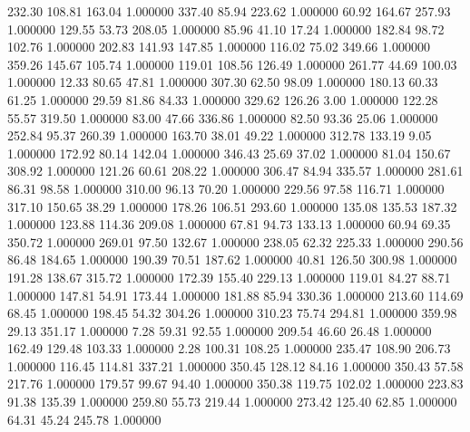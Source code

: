     232.30    108.81    163.04  1.000000
    337.40     85.94    223.62  1.000000
     60.92    164.67    257.93  1.000000
    129.55     53.73    208.05  1.000000
     85.96     41.10     17.24  1.000000
    182.84     98.72    102.76  1.000000
    202.83    141.93    147.85  1.000000
    116.02     75.02    349.66  1.000000
    359.26    145.67    105.74  1.000000
    119.01    108.56    126.49  1.000000
    261.77     44.69    100.03  1.000000
     12.33     80.65     47.81  1.000000
    307.30     62.50     98.09  1.000000
    180.13     60.33     61.25  1.000000
     29.59     81.86     84.33  1.000000
    329.62    126.26      3.00  1.000000
    122.28     55.57    319.50  1.000000
     83.00     47.66    336.86  1.000000
     82.50     93.36     25.06  1.000000
    252.84     95.37    260.39  1.000000
    163.70     38.01     49.22  1.000000
    312.78    133.19      9.05  1.000000
    172.92     80.14    142.04  1.000000
    346.43     25.69     37.02  1.000000
     81.04    150.67    308.92  1.000000
    121.26     60.61    208.22  1.000000
    306.47     84.94    335.57  1.000000
    281.61     86.31     98.58  1.000000
    310.00     96.13     70.20  1.000000
    229.56     97.58    116.71  1.000000
    317.10    150.65     38.29  1.000000
    178.26    106.51    293.60  1.000000
    135.08    135.53    187.32  1.000000
    123.88    114.36    209.08  1.000000
     67.81     94.73    133.13  1.000000
     60.94     69.35    350.72  1.000000
    269.01     97.50    132.67  1.000000
    238.05     62.32    225.33  1.000000
    290.56     86.48    184.65  1.000000
    190.39     70.51    187.62  1.000000
     40.81    126.50    300.98  1.000000
    191.28    138.67    315.72  1.000000
    172.39    155.40    229.13  1.000000
    119.01     84.27     88.71  1.000000
    147.81     54.91    173.44  1.000000
    181.88     85.94    330.36  1.000000
    213.60    114.69     68.45  1.000000
    198.45     54.32    304.26  1.000000
    310.23     75.74    294.81  1.000000
    359.98     29.13    351.17  1.000000
      7.28     59.31     92.55  1.000000
    209.54     46.60     26.48  1.000000
    162.49    129.48    103.33  1.000000
      2.28    100.31    108.25  1.000000
    235.47    108.90    206.73  1.000000
    116.45    114.81    337.21  1.000000
    350.45    128.12     84.16  1.000000
    350.43     57.58    217.76  1.000000
    179.57     99.67     94.40  1.000000
    350.38    119.75    102.02  1.000000
    223.83     91.38    135.39  1.000000
    259.80     55.73    219.44  1.000000
    273.42    125.40     62.85  1.000000
     64.31     45.24    245.78  1.000000
